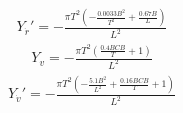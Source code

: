 \documentclass[review]{elsarticle}
\begin{document}
\begin{equation}
\begin{split}\displaystyle Y_{\dot{r}}' = - \frac{\pi T^{2} \left(- \frac{0.0033 B^{2}}{T^{2}} + \frac{0.67 B}{L}\right)}{L^{2}}\end{split}
\end{equation}\begin{equation}\label{equation:05.01_case_studies:eqyv}
\begin{split}\displaystyle Y_{v} = - \frac{\pi T^{2} \left(\frac{0.4 B CB}{T} + 1\right)}{L^{2}}\end{split}
\end{equation}\begin{equation}\label{equation:05.01_case_studies:eqyvdot}
\begin{split}\displaystyle Y_{\dot{v}}' = - \frac{\pi T^{2} \left(- \frac{5.1 B^{2}}{L^{2}} + \frac{0.16 B CB}{T} + 1\right)}{L^{2}}\end{split}
\end{equation}
\end{document}
